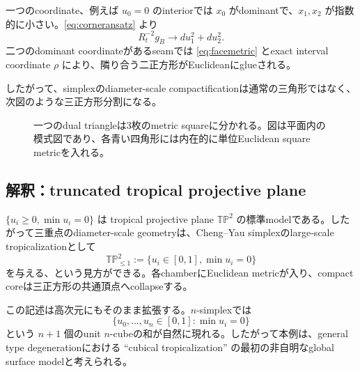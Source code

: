 \documentclass[11pt,a4paper]{ltjsarticle}
\theoremstyle{definition}
\theoremstyle{remark}
\begin{document}
一つのcoordinate、例えば $u_0=0$ のinteriorでは $x_0$ がdominantで、$x_1,x_2$ が指数的に小さい。\eqref{eq:corneransatz} より
\begin{equation}\label{eq:squaremetric}
 R_t^{-2}g_B\longrightarrow du_1^2+du_2^2.
\end{equation}
二つのdominant coordinateがあるseamでは \eqref{eq:facemetric} とexact interval coordinate $\rho$ により、隣り合う二正方形がEuclideanにglueされる。

したがって、simplexのdiameter-scale compactificationは通常の三角形ではなく、次図のような三正方形分割になる。

\begin{figure}[ht]
\centering
{}
\caption{一つのdual triangleは3枚のmetric squareに分かれる。図は平面内の模式図であり、各青い四角形には内在的に単位Euclidean square metricを入れる。}
\label{fig:three-squares}
\end{figure}

\subsection{解釈：truncated tropical projective plane}

$\{u_i\geq0,\min u_i=0\}$ は tropical projective plane $\mathbb{TP}^2$ の標準modelである。したがって三重点のdiameter-scale geometryは、Cheng--Yau simplexのlarge-scale tropicalizationとして
\[
 \mathbb{TP}^2_{\leq1}:=\{u_i\in[0,1],\min u_i=0\}
\]
を与える、という見方ができる。各chamberにEuclidean metricが入り、compact coreは三正方形の共通頂点へcollapseする。

この記述は高次元にもそのまま拡張する。$n$-simplexでは
\[
 \{u_0,\dots,u_n\in[0,1]:\min u_i=0\}
\]
という $n+1$ 個のunit $n$-cubeの和が自然に現れる。したがって本例は、general type degenerationにおける ``cubical tropicalization'' の最初の非自明なglobal surface modelと考えられる。
\end{document}
